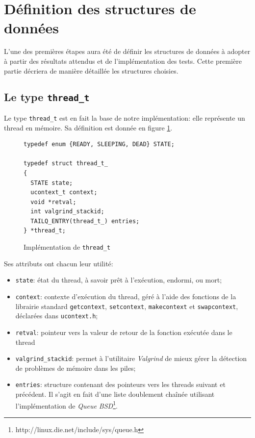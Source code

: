 \documentclass[a4paper,11pt]{article}
\begin{document}
\section{Définition des structures de données}

L'une des premières étapes aura été de définir les structures de données à adopter à partir des résultats attendus et de l'implémentation des tests. Cette première partie décriera de manière détaillée les structures choisies.

\subsection{Le type \texttt{thread\_t}}

Le type \texttt{thread\_t} est en fait la base de notre implémentation: elle représente un thread en mémoire. Sa définition est donnée en figure \ref{threadt}.

\begin{figure}[H]
\begin{lstlisting}
typedef enum {READY, SLEEPING, DEAD} STATE;

typedef struct thread_t_
{
  STATE state;
  ucontext_t context;
  void *retval;
  int valgrind_stackid;
  TAILQ_ENTRY(thread_t_) entries;
} *thread_t;
\end{lstlisting}
\caption{Implémentation de \texttt{thread\_t}}
\label{threadt}
\end{figure}

Ses attributs ont chacun leur utilité:
\begin{itemize}
  \item \texttt{state}: état du thread, à savoir prêt à l'exécution, endormi, ou mort;
  \item \texttt{context}: contexte d'exécution du thread, géré à l'aide des fonctions de la librairie standard \texttt{getcontext}, \texttt{setcontext}, \texttt{makecontext} et \texttt{swapcontext}, déclarées dans \texttt{ucontext.h};
  \item \texttt{retval}: pointeur vers la valeur de retour de la fonction exécutée dans le thread
  \item \texttt{valgrind\_stackid}: permet à l'utilitaire \textit{Valgrind} de mieux gérer la détection de problèmes de mémoire dans les piles;
  \item \texttt{entries}: structure contenant des pointeurs vers les threads suivant et précédent. Il s'agit en fait d'une liste doublement chaînée utilisant l'implémentation de \textit{Queue BSD}\footnote{http://linux.die.net/include/sys/queue.h}.
\end{itemize}
\end{document}
